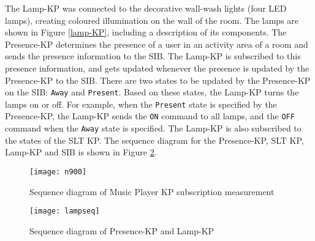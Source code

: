 The Lamp-KP was connected to the decorative wall-wash lights (four LED lamps), creating coloured illumination on the wall of the room. The lamps are shown in Figure \ref{lamp-KP}, including a description of its components. The Presence-KP  determines the presence of a user in an activity area of a room and sends the presence information to the SIB. The Lamp-KP is subscribed to this presence information, and gets updated whenever the presence is updated by the Presence-KP to the \ac{SIB}. There are two states to be updated by the Presence-KP on the \ac{SIB}: \texttt{Away} and \texttt{Present}. Based on these states, the Lamp-KP turns the lamps on or off. For example, when the \texttt{Present} state is specified by the Presence-KP, the Lamp-KP sends  the \texttt{ON} command to all lamps, and the \texttt{OFF} command when the \texttt{Away} state is specified.  The Lamp-KP is also subscribed to the states of the \ac{SLT} KP. The sequence diagram for the Presence-KP, \ac{SLT} KP, Lamp-KP and \ac{SIB} is shown in Figure \ref{sequence-lamp}.


\begin{figure}[bth]
\centering
\texttt{[image: n900]}
\caption{Sequence diagram of Music Player KP subscription measurement}
\label{N900}
\end{figure}

\begin{figure}[bth]
\centering
\texttt{[image: lampseq]}
\caption{Sequence diagram of Presence-KP and Lamp-KP}
\label{sequence-lamp}
\end{figure}


% 	
% 

